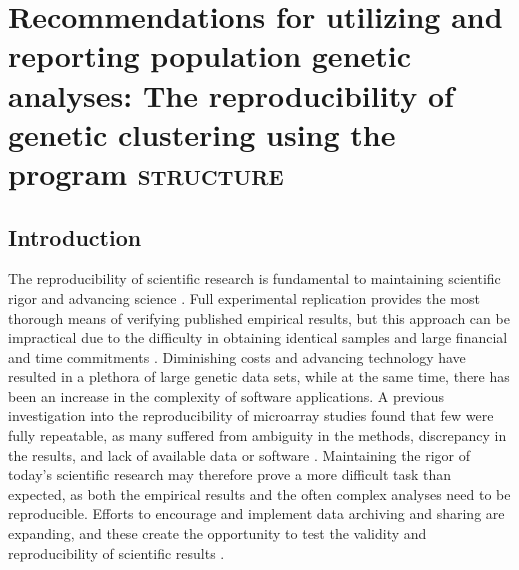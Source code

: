 \chapter{Recommendations for utilizing and reporting population genetic analyses: The 
reproducibility of genetic clustering using the program \textsc{structure}}
\label{chap:reproducibility}



\section{Introduction}
The reproducibility of scientific research is fundamental to maintaining scientific rigor 
and advancing science \citep{Price:2011}. Full experimental replication provides the most thorough 
means of verifying published empirical results, but this approach can be impractical due to 
the difficulty in obtaining identical samples and large financial and time commitments 
\citep{Peng:2011}. Diminishing costs and advancing technology have resulted in a plethora of large 
genetic data sets, while at the same time, there has been an increase in the complexity of 
software applications. A previous investigation into the reproducibility of microarray studies 
found that few were fully repeatable, as many suffered from ambiguity in the methods, discrepancy 
in the results, and lack of available data or software \citep{Ioannidis:2009}. Maintaining 
the rigor of today's scientific research may therefore prove a more difficult task than expected, 
as both the empirical results and the often complex analyses need to be reproducible. Efforts to 
encourage and implement data archiving and sharing are expanding, and these create the opportunity 
to test the validity and reproducibility of scientific results \citep{Whitlock:2010}.

